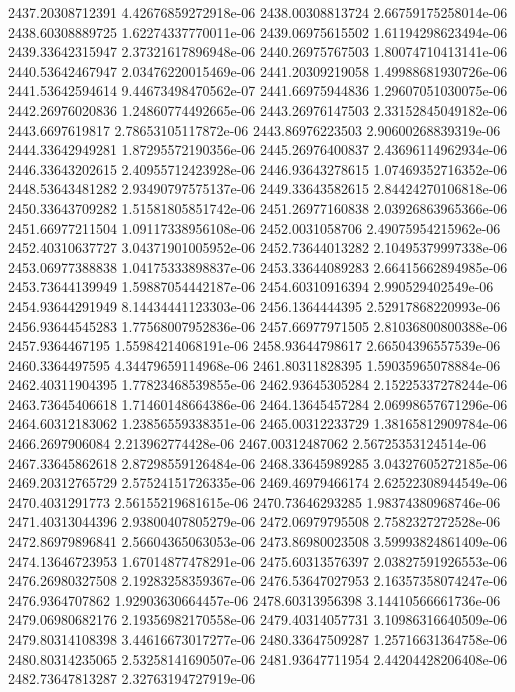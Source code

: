 {2437.20308712391 4.42676859272918e-06
2438.00308813724 2.66759175258014e-06
2438.60308889725 1.62274337770011e-06
2439.06975615502 1.61194298623494e-06
2439.33642315947 2.37321617896948e-06
2440.26975767503 1.80074710413141e-06
2440.53642467947 2.03476220015469e-06
2441.20309219058 1.49988681930726e-06
2441.53642594614 9.44673498470562e-07
2441.66975944836 1.29607051030075e-06
2442.26976020836 1.24860774492665e-06
2443.26976147503 2.33152845049182e-06
2443.6697619817 2.78653105117872e-06
2443.86976223503 2.90600268839319e-06
2444.33642949281 1.87295572190356e-06
2445.26976400837 2.43696114962934e-06
2446.33643202615 2.40955712423928e-06
2446.93643278615 1.07469352716352e-06
2448.53643481282 2.93490797575137e-06
2449.33643582615 2.84424270106818e-06
2450.33643709282 1.51581805851742e-06
2451.26977160838 2.03926863965366e-06
2451.66977211504 1.09117338956108e-06
2452.0031058706 2.49075954215962e-06
2452.40310637727 3.04371901005952e-06
2452.73644013282 2.10495379997338e-06
2453.06977388838 1.04175333898837e-06
2453.33644089283 2.66415662894985e-06
2453.73644139949 1.59887054442187e-06
2454.60310916394 2.990529402549e-06
2454.93644291949 8.14434441123303e-06
2456.1364444395 2.52917868220993e-06
2456.93644545283 1.77568007952836e-06
2457.66977971505 2.81036800800388e-06
2457.9364467195 1.55984214068191e-06
2458.93644798617 2.66504396557539e-06
2460.3364497595 4.34479659114968e-06
2461.80311828395 1.59035965078884e-06
2462.40311904395 1.77823468539855e-06
2462.93645305284 2.15225337278244e-06
2463.73645406618 1.71460148664386e-06
2464.13645457284 2.06998657671296e-06
2464.60312183062 1.23856559338351e-06
2465.00312233729 1.38165812909784e-06
2466.2697906084 2.213962774428e-06
2467.00312487062 2.56725353124514e-06
2467.33645862618 2.87298559126484e-06
2468.33645989285 3.04327605272185e-06
2469.20312765729 2.57524151726335e-06
2469.46979466174 2.62522308944549e-06
2470.4031291773 2.56155219681615e-06
2470.73646293285 1.98374380968746e-06
2471.40313044396 2.93800407805279e-06
2472.06979795508 2.7582327272528e-06
2472.86979896841 2.56604365063053e-06
2473.86980023508 3.59993824861409e-06
2474.13646723953 1.67014877478291e-06
2475.60313576397 2.03827591926553e-06
2476.26980327508 2.19283258359367e-06
2476.53647027953 2.16357358074247e-06
2476.9364707862 1.92903630664457e-06
2478.60313956398 3.14410566661736e-06
2479.06980682176 2.19356982170558e-06
2479.40314057731 3.10986316640509e-06
2479.80314108398 3.44616673017277e-06
2480.33647509287 1.25716631364758e-06
2480.80314235065 2.53258141690507e-06
2481.93647711954 2.44204428206408e-06
2482.73647813287 2.32763194727919e-06
}
